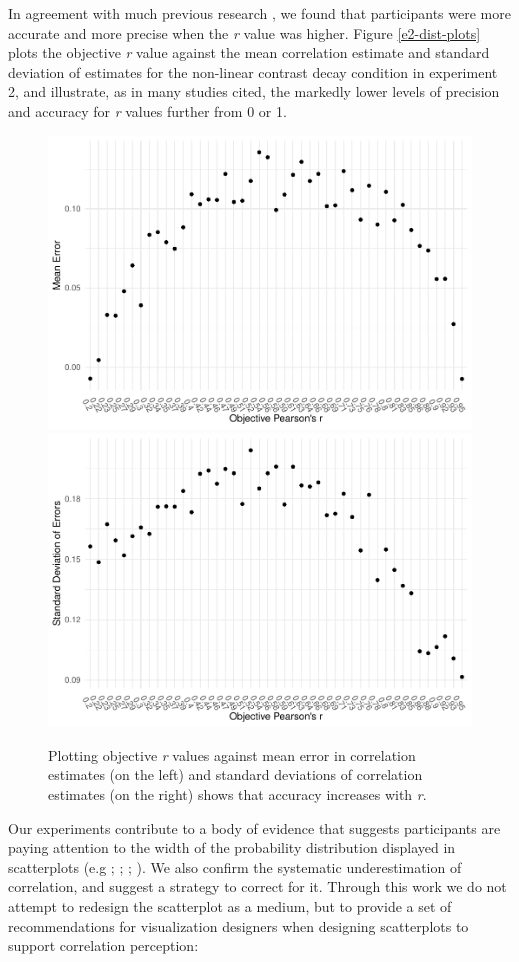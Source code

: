 \documentclass[preprint, 3p,
authoryear]{elsarticle} %
\begin{document}
In agreement with much previous research
\citep{rensink_2010, rensink_2012, rensink_2014, rensink_2017, pollack_1960},
we found that participants were more accurate and more precise when the
\emph{r} value was higher. Figure \ref{e2-dist-plots} plots the
objective \emph{r} value against the mean correlation estimate and
standard deviation of estimates for the non-linear contrast decay
condition in experiment 2, and illustrate, as in many studies cited, the
markedly lower levels of precision and accuracy for \emph{r} values
further from 0 or 1.

\begin{figure}
\includegraphics[width=0.5\linewidth]{contrast_and_scatterplots_files/figure-latex/e2-dist-plots-1} \includegraphics[width=0.5\linewidth]{contrast_and_scatterplots_files/figure-latex/e2-dist-plots-2} \caption{\label{e2-dist-plots}Plotting objective \textit{r} values against mean error in correlation estimates (on the left) and standard deviations of correlation estimates (on the right) shows that accuracy increases with \textit{r}.}\label{fig:e2-dist-plots}
\end{figure}

Our experiments contribute to a body of evidence that suggests
participants are paying attention to the width of the probability
distribution displayed in scatterplots (e.g \citet{cleveland_1982};
\citet{meyer_1997}; \citet{yang_2019}; \citet{rensink_2017}). We also
confirm the systematic underestimation of correlation, and suggest a
strategy to correct for it. Through this work we do not attempt to
redesign the scatterplot as a medium, but to provide a set of
recommendations for visualization designers when designing scatterplots
to support correlation perception:
\end{document}
